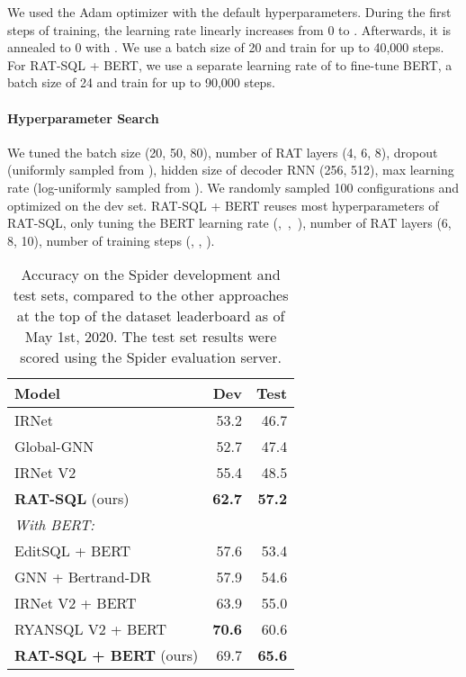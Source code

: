 \documentclass[11pt,a4paper,final]{article}
\begin{document}
We used the Adam optimizer \citep{kingmaAdamMethodStochastic2014} with the default hyperparameters.
During the first  steps of training, the learning rate linearly increases
from 0 to .
Afterwards, it is annealed to 0 with
.
We use a batch size of 20 and train for up to 40,000 steps.
For RAT-SQL + BERT, we use a separate learning rate of  to fine-tune BERT,
a batch size of 24 and train for up to 90,000 steps.


\paragraph{Hyperparameter Search}
We tuned the batch size (20, 50, 80), number of RAT layers (4, 6, 8), dropout (uniformly sampled from ),
hidden size of decoder RNN (256, 512), max learning rate (log-uniformly sampled from ).
We randomly sampled 100 configurations and optimized on the dev set.
RAT-SQL + BERT reuses most hyperparameters of RAT-SQL, only tuning the BERT learning rate (,\, ,\, ), number of RAT layers (6, 8, 10), number
of training steps (, , ).





\begin{table}
    \centering
    \small
    \begin{tabular}{lrr}
        \toprule
        \bfseries Model & \bfseries Dev & \bfseries Test \\
        \midrule
IRNet \citep{irnet} & 53.2 & 46.7 \\
        Global-GNN \citep{bogin2019global} & 52.7 & 47.4 \\
        IRNet V2 \cite{irnet} & 55.4 & 48.5 \\
        \textbf{RAT-SQL} (ours) & \textbf{62.7} & \textbf{57.2} \\
        \midrule
        \textit{With BERT:} \\
        EditSQL + BERT \citep{EditSQL2019} & 57.6 & 53.4 \\
GNN + Bertrand-DR \citep{bertrand} & 57.9 & 54.6 \\
IRNet V2 + BERT \cite{irnet} & 63.9 & 55.0 \\
        RYANSQL V2 + BERT \citep{ryansql} & \textbf{70.6} & 60.6 \\
\textbf{RAT-SQL + BERT} (ours) & 69.7 & \textbf{65.6} \\
        \bottomrule
    \end{tabular}
    \caption{Accuracy on the Spider development and test sets, compared to the other approaches at the top of the
        dataset leaderboard as of May 1st, 2020. The test set results were scored using the Spider evaluation server.}
    \label{table:main-leaderboard}
    \vspace{-1\baselineskip}
\end{table}
\end{document}
